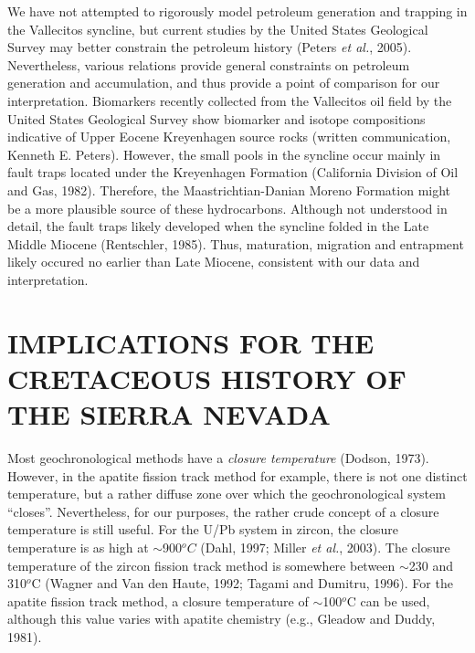 \documentclass[11pt,twoside]{article}
\begin{document}
We  have not attempted  to rigorously  model petroleum  generation and
trapping in the Vallecitos syncline, but current studies by the United
States Geological  Survey may  better constrain the  petroleum history
(Peters {\it  et al.}, 2005). Nevertheless,  various relations provide
general constraints on petroleum generation and accumulation, and thus
provide  a point  of  comparison for  our interpretation.   Biomarkers
recently collected from the Vallecitos  oil field by the United States
Geological Survey  show biomarker and  isotope compositions indicative
of  Upper  Eocene  Kreyenhagen  source rocks  (written  communication,
Kenneth E.  Peters).   However, the small pools in  the syncline occur
mainly  in  fault  traps   located  under  the  Kreyenhagen  Formation
(California  Division   of  Oil   and  Gas,  1982).    Therefore,  the
Maastrichtian-Danian Moreno Formation might be a more plausible source
of these  hydrocarbons.  Although not understood in  detail, the fault
traps likely  developed when  the syncline folded  in the  Late Middle 
Miocene (Rentschler, 1985). Thus, maturation, migration and entrapment
likely occured no earlier than  Late Miocene, consistent with our data
and interpretation.\\

\section*{\uppercase{Implications for the Cretaceous history of the Sierra Nevada}}
\label{sec:predepo}

Most  geochronological  methods   have  a  {\it  closure  temperature}
(Dodson,  1973).  However,  in the  apatite fission  track  method for
example, there is  not one distinct temperature, but  a rather diffuse
zone over which the geochronological system ``closes''.  Nevertheless,
for our purposes, the rather crude concept of a closure temperature is
still useful.  For the U/Pb  system in zircon, the closure temperature
is as high at $\sim$900$^oC$  (Dahl, 1997; Miller {\it et al.}, 2003).
The  closure  temperature  of  the  zircon  fission  track  method  is
somewhere between  $\sim$230 and 310$^o$C  (Wagner and Van  den Haute,
1992;  Tagami  and Dumitru,  1996).   For  the  apatite fission  track
method, a closure temperature  of $\sim$100$^o$C can be used, although
this  value varies with  apatite chemistry  (e.g., Gleadow  and Duddy,
1981).\\
\end{document}
